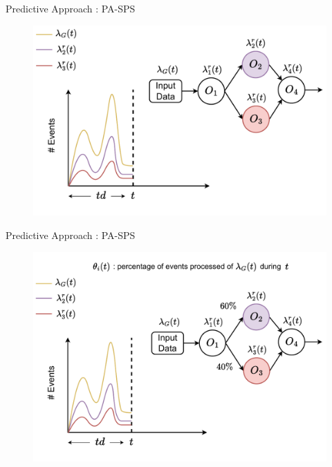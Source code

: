 \begin{frame}{Predictive Approach : PA-SPS}
\begin{figure}
    \centering
    \includegraphics[scale=0.63]{images/concepts/predictive/PA-SPS-Prediction-4.pdf}
\end{figure}
\end{frame}

\begin{frame}{Predictive Approach : PA-SPS}
\vspace*{-0.5cm}
\begin{figure}
    \centering
    \includegraphics[scale=0.6]{images/concepts/predictive/PA-SPS-Prediction-5.pdf}
\end{figure}
\end{frame}

